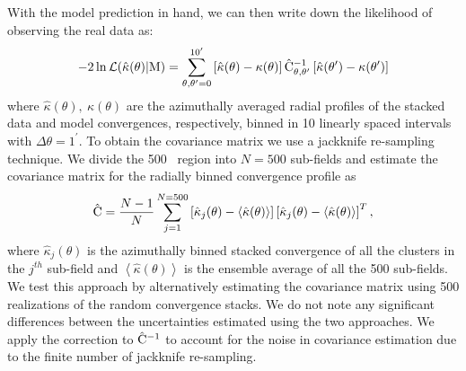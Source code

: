With the model prediction in hand, we can then write down the likelihood of observing the real data as: 
\begin{equation}
-2\ln\mathcal{L (\hat{\kappa}(\theta)| \rm{M}}) = 
\sum_{\theta, \theta^{\prime} = 0}^{10^{\prime}}\left[\hat{\kappa}(\theta) - \kappa(\theta)\right] \hat{{\rm C}}_{\theta, \theta^{\prime}}^{-1} \left[\hat{\kappa}(\theta^{\prime}) - \kappa(\theta^{\prime})\right]
\label{eq_QE_likelihood}
\end{equation}
where $\hat{\kappa}(\theta),\ \kappa(\theta)$ are the azimuthally averaged radial profiles of the stacked data and model convergences, respectively, binned in 10 linearly spaced intervals with $\Delta\theta = 1^{\prime}$. %
To obtain the covariance matrix we use a jackknife re-sampling technique. We divide the \sptpol{} 500 \sqdeg\ region into $N=500$ sub-fields and estimate the covariance matrix for the radially binned convergence profile as 
\begin{equation}
\hat{{\rm C}} = \frac{N-1}{N} \sum\limits_{j=1}^{N = 500} \left[\hat{\kappa}_{j}(\theta) - \left<\hat{\kappa}(\theta)\right>\right] \left[\hat{\kappa}_{j}(\theta) - \left<\hat{\kappa}(\theta)\right>\right]^{T},
\label{eq_JK_cov}
\end{equation}
where $\hat{\kappa}_{j}(\theta)$ is the azimuthally binned stacked convergence of all the clusters in the $j^{th}$ sub-field and  $\left<\hat{\kappa}(\theta)\right>$ is the ensemble average of all the 500 sub-fields.
We test this approach by alternatively estimating the covariance matrix using 500 realizations of the random convergence stacks. 
We do not note any significant differences between the uncertainties estimated using the two approaches. 
We apply the \citet{hartlap06} correction to $\hat{{\rm C}}^{-1}$ to account for the noise in covariance estimation due to the finite number of jackknife re-sampling.


